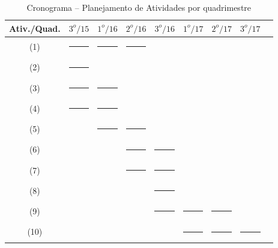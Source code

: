 \documentclass[a4paper,11pt,brazil,fleqn]{article}
\begin{document}
\begin{table}[!ht]
\begin{center}
\caption[Cronograma]{Cronograma -- Planejamento de Atividades por quadrimestre}
\begin{tabular}{|c|c|c|c|c|c|c|c|c|} 
	\hline
	\rule[-2mm]{0mm}{6mm}
	Ativ./Quad. & $3^o/15$ & $1^o/16$ & $2^o/16$ & $3^o/16$ & $1^o/17$ & $2^o/17$ & $3^o/17$ \\
	\hline
	\rule[-2mm]{0mm}{6mm}
	(1) & \rule[0mm]{10mm}{2mm} & \rule[0mm]{10mm}{2mm} & \rule[0mm]{10mm}{2mm} &  &  &  &   \\
	\rule[-1mm]{0mm}{5mm}
	(2) & \rule[0mm]{10mm}{2mm} &  &  &  &  &  &   \\
	\rule[-1mm]{0mm}{5mm}
	(3) & \rule[0mm]{10mm}{2mm} & \rule[0mm]{10mm}{2mm}  &  &  &  &  &   \\
	\rule[-1mm]{0mm}{5mm}
	(4) & \rule[0mm]{10mm}{2mm} & \rule[0mm]{10mm}{2mm} &  &  &  &  &   \\
	\rule[-1mm]{0mm}{5mm}
	(5) &  & \rule[0mm]{10mm}{2mm} & \rule[0mm]{10mm}{2mm} &  &  &  &   \\
	\rule[-1mm]{0mm}{5mm}
	(6) &  &  & \rule[0mm]{10mm}{2mm} & \rule[0mm]{10mm}{2mm}  &  &  &   \\
	\rule[-1mm]{0mm}{5mm}
	(7) &  &  & \rule[0mm]{10mm}{2mm} & \rule[0mm]{10mm}{2mm} &  &  &   \\
	\rule[-1mm]{0mm}{5mm}
	(8) &  &  &  & \rule[0mm]{10mm}{2mm}  &  &  &   \\
	\rule[-1mm]{0mm}{5mm}
	(9) &  &  &  & \rule[0mm]{10mm}{2mm} & \rule[0mm]{10mm}{2mm} & \rule[0mm]{10mm}{2mm} &   \\
	\rule[-2mm]{0mm}{6mm}
	(10) &  &  &  &  & \rule[0mm]{10mm}{2mm} & \rule[0mm]{10mm}{2mm} & \rule[0mm]{10mm}{2mm}  \\
	\hline
\end{tabular} 
\label{crono}
\end{center}
\end{table}





{} 



\end{document}
